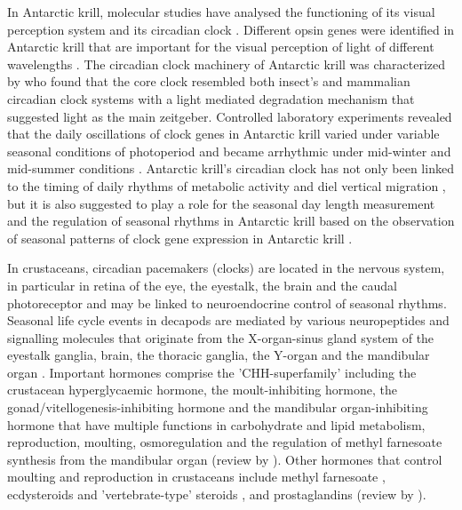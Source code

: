 In Antarctic krill, molecular studies have analysed the functioning of its
visual perception system and its circadian clock \citep{biscontin_opsin_2016, biscontin_functional_2017}. Different opsin genes were identified in Antarctic krill that are
important for the visual perception of light of different wavelengths
\citep{biscontin_opsin_2016}. The circadian clock machinery of Antarctic krill was
characterized by \citet{biscontin_functional_2017} who found that the core clock
resembled both insect's and mammalian circadian clock systems with a light
mediated degradation mechanism that suggested light as the main zeitgeber.
Controlled laboratory experiments revealed that the daily oscillations of clock
genes in Antarctic krill varied under variable seasonal conditions of
photoperiod and became arrhythmic under mid-winter and mid-summer conditions
\citep{piccolin_seasonal_2018}. Antarctic krill's circadian clock has not only been
linked to the timing of daily rhythms of metabolic activity \citep{de_pitta_antarctic_2013, piccolin_seasonal_2018, teschke_circadian_2011} and diel vertical migration \citep{gaten_is_2008}, but it is also suggested to play a role for the seasonal
day length measurement and the regulation of seasonal rhythms in Antarctic
krill based on the observation of seasonal patterns of clock gene expression in
Antarctic krill \citep{piccolin_photoperiodic_2018}.

In crustaceans, circadian pacemakers (clocks) are located in the nervous
system, in particular in retina of the eye, the eyestalk, the brain and the
caudal photoreceptor \citep{arechiga_distributed_2002, rodriguez_y_baena_could_2008} and may be linked to neuroendocrine control of seasonal rhythms. Seasonal
life cycle events in decapods are mediated by various neuropeptides and
signalling molecules that originate from the X-organ-sinus gland system of the
eyestalk ganglia, brain, the thoracic ganglia, the Y-organ and the mandibular
organ \citep{nagaraju_reproductive_2011}. Important hormones comprise the 'CHH-superfamily'
including the crustacean hyperglycaemic hormone, the moult-inhibiting hormone,
the gonad/vitellogenesis-inhibiting hormone and the mandibular organ-inhibiting
hormone that have multiple functions in carbohydrate and lipid metabolism,
reproduction, moulting, osmoregulation and the regulation of methyl farnesoate
synthesis from the mandibular organ (review by \citet{webster_chh-superfamily_2012}). Other
hormones that control moulting and reproduction in crustaceans include methyl
farnesoate \citep{reddy_metabolic_2014}, ecdysteroids and 'vertebrate-type' steroids
\citep{lafont_steroids_2007}, and prostaglandins (review by \citet{nagaraju_reproductive_2011}).

